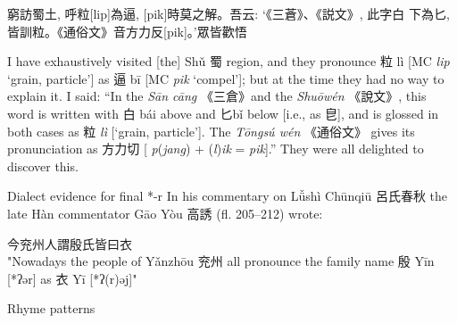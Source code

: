   

窮訪蜀土, 呼粒{[}lip]為逼, {[}pik]時莫之解。吾云: `《三蒼》、《説文》, 此字白 下為匕, 皆訓粒。《通俗文》音方力反{[}pik]。'眾皆歡悟

  

I have exhaustively visited {[}the] Shǔ 蜀 region, and they pronounce
粒 lì {[}MC \emph{lip} `grain, particle'] as 逼 bī {[}MC \emph{pik}
`compel']; but at the time they had no way to explain it. I said: ``In
the \emph{Sān cāng} 《三倉》and the \emph{Shuōwén} 《說文》, this word
is written with 白 bái above and 匕bǐ below {[}i.e., as 皀], and is
glossed in both cases as 粒 \emph{lì }{[}`grain, particle']. The
 \emph{Tōngsú wén} 《通俗文》 gives its pronunciation as 方力切
{[} \emph{p}(\emph{jang}) + (\emph{l})\emph{ik} = \emph{pik}].'' They
were all delighted to discover this. 


{Dialect evidence for final *-r}
In his commentary on Lǚshì Chūnqiū 呂氏春秋 the late Hàn commentator Gāo Yòu 高誘 (fl. 205–212) wrote: 

  

今兖州人謂殷氏皆曰衣
\\ "Nowadays the people of Yǎnzhōu 兖州 all pronounce the family name 殷 Yīn [*ʔər] as 衣 Yī [*ʔ(r)əj]" %






{Rhyme patterns}
    
